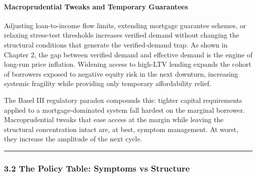 \documentclass[
]{article}
\begin{document}
\paragraph{Macroprudential Tweaks and Temporary
Guarantees}\label{macroprudential-tweaks-and-temporary-guarantees}

Adjusting loan-to-income flow limits, extending mortgage guarantee
schemes, or relaxing stress-test thresholds increases verified demand
without changing the structural conditions that generate the
verified-demand trap. As shown in Chapter 2, the gap between verified
demand and effective demand is the engine of long-run price inflation.
Widening access to high-LTV lending expands the cohort of borrowers
exposed to negative equity risk in the next downturn, increasing
systemic fragility while providing only temporary affordability relief.

The Basel III regulatory paradox compounds this: tighter capital
requirements applied to a mortgage-dominated system fall hardest on the
marginal borrower. Macroprudential tweaks that ease access at the margin
while leaving the structural concentration intact are, at best, symptom
management. At worst, they increase the amplitude of the next cycle.

\begin{center}\rule{0.5\linewidth}{0.5pt}\end{center}

\subsubsection{3.2 The Policy Table: Symptoms vs
Structure}\label{the-policy-table-symptoms-vs-structure}
\end{document}
